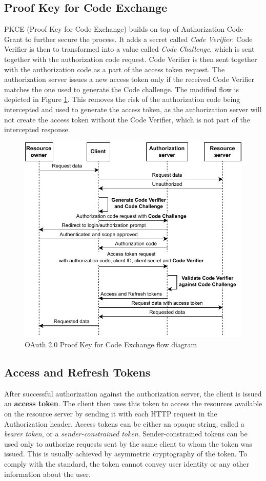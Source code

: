 \subsection*{Proof Key for Code Exchange}
PKCE (Proof Key for Code Exchange) \cite{pkce_rfc} builds on top of Authorization Code Grant to further secure the process. It adds a secret called \emph{Code Verifier}. Code Verifier is then to transformed into a value called \emph{Code Challenge}, which is sent together with the authorization code request. Code Verifier is then sent together with the authorization code as a part of the access token request. The authorization server issues a new access token only if the received Code Verifier matches the one used to generate the Code challenge. The modified flow is depicted in Figure \ref{fig:oauth2_pkce}. This removes the risk of the authorization code being intercepted and used to generate the access token, as the authorization server will not create the access token without the Code Verifier, which is not part of the intercepted response.

\begin{figure}[H]
  \centering
  \includegraphics[width=.8 \linewidth]{figures/auth-sequence-pkce.pdf}
  \caption{OAuth 2.0 Proof Key for Code Exchange flow diagram}
  \label{fig:oauth2_pkce}
\end{figure}

\subsection*{Access and Refresh Tokens}
After successful authorization against the authorization server, the client is issued an \textbf{access token}. The client then uses this token to access the resources available on the resource server by sending it with each HTTP request in the Authorization header. Access tokens can be either an opaque string, called a \emph{bearer token}, or a \emph{sender-constrained token}. Sender-constrained tokens can be used only to authorize requests sent by the same client to whom the token was issued. This is usually achieved by asymmetric cryptography of the token. To comply with the standard, the token cannot convey user identity or any other information about the user.


